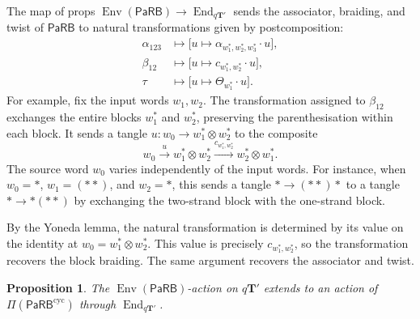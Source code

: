 \documentclass{amsart}
\newcommand{\bT}{\mathbf{T}}
\newcommand{\PaRB}{\mathsf{PaRB}}
\newcommand{\twist}{\tau}
\newcommand{\End}{\operatorname{End}}
\newcommand{\Env}{\operatorname{Env}}
\newtheorem{prop}[theorem]{Proposition}%
\theoremstyle{definition}
\numberwithin{equation}{section}
\begin{document}
The map of props $\Env(\PaRB)\to\End_{q\bT'}$ sends the
associator, braiding, and twist of $\PaRB$ to natural
transformations given by postcomposition:
\[
\begin{aligned}
\alpha_{123}
&\longmapsto
\bigl[u\mapsto\alpha_{w_1^*,w_2^*,w_3^*}\cdot u\bigr],\\
\beta_{12}
&\longmapsto
\bigl[u\mapsto c_{w_1^*,w_2^*}\cdot u\bigr],\\
\twist
&\longmapsto
\bigl[u\mapsto\Theta_{w_1^*}\cdot u\bigr].
\end{aligned}
\]
For example, fix the input words $w_1,w_2$. The transformation
assigned to $\beta_{12}$ exchanges the entire blocks $w_1^*$
and $w_2^*$, preserving the parenthesisation within each block.
It sends a tangle $u\colon w_0\to w_1^*\otimes w_2^*$ to
the composite
\[
w_0\xrightarrow{u}w_1^*\otimes w_2^*
\xrightarrow{c_{w_1^*,w_2^*}}w_2^*\otimes w_1^*.
\]
The source word $w_0$ varies independently of the input words.
For instance, when $w_0=*$, $w_1=(**)$, and $w_2=*$, this
sends a tangle $*\to(**)*$ to a tangle $*\to*(**)$ by
exchanging the two-strand block with the one-strand block.

By the Yoneda lemma, the natural transformation is determined
by its value on the identity at
$w_0=w_1^*\otimes w_2^*$. This value is precisely
$c_{w_1^*,w_2^*}$, so the transformation recovers the block
braiding. The same argument recovers the associator and twist.

\begin{prop}
\label{prop: metric prop action through cyclic endomorphisms}
The $\Env(\PaRB)$-action on $q\bT'$ extends to an action of
$\Pi(\PaRB^{\mathrm{cyc}})$ through $\End_{q\bT'}$.
\end{prop}
\end{document}
